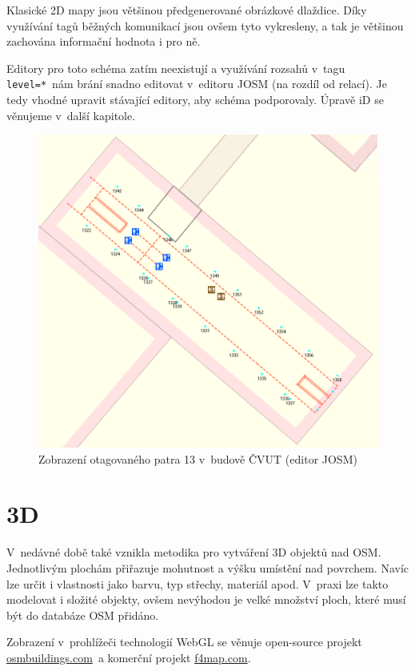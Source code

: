 Klasické 2D mapy jsou většinou předgenerované obrázkové dlaždice. Díky využívání tagů běžných komunikací jsou ovšem tyto vykresleny, a tak je většinou zachována informační hodnota i pro ně.

Editory pro toto schéma zatím neexistují a využívání rozsahů v~tagu \texttt{level=*}~nám brání snadno editovat v~editoru JOSM (na rozdíl od relací). Je tedy vhodné upravit stávající editory, aby schéma podporovaly. Úpravě iD se věnujeme v~další kapitole.

 \begin{figure}
	  \centering
      \includegraphics[width=.9\textwidth]{img/210-coreindoor-cvut-13.png}
      \caption{Zobrazení otagovaného patra 13 v~budově ČVUT (editor JOSM)}
      \label{obr210}
  \end{figure}

\section{3D}\label{d}

V~nedávné době také vznikla metodika pro vytváření 3D objektů nad OSM. Jednotlivým plochám přiřazuje mohutnost a výšku umístění nad povrchem. Navíc lze určit i vlastnosti jako barvu, typ střechy, materiál apod. V~praxi lze takto modelovat i složité objekty, ovšem nevýhodou je velké množství ploch, které musí být do databáze OSM přidáno.

Zobrazení v~prohlížeči technologií WebGL se věnuje open-source projekt \href{http://osmbuildings.com}{osmbuildings.com}~a komerční projekt \href{http://f4map.com}{f4map.com}.

